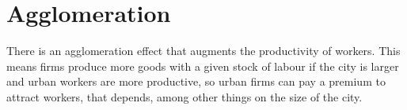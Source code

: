 \section{Agglomeration}
There is an agglomeration effect that augments the productivity of workers. This means firms produce more goods with a given stock of labour if the city is larger and urban workers are more productive, %
so urban firms can pay a premium to attract workers, that depends, among other things on the size of the city. %


